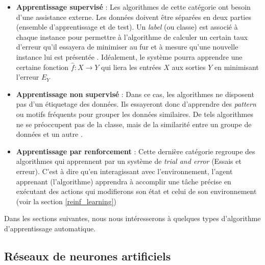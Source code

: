 \begin{itemize}
	\item  \textbf{Apprentissage supervisé} : Les algorithmes de cette catégorie ont besoin d'une assistance externe. Les données doivent être séparées en deux parties (ensemble d'apprentissage et de test). Un \textit{label} (ou classe) est associé à chaque instance pour permettre à l'algorithme de calculer un certain taux d'erreur qu'il essayera de minimiser au fur et à mesure qu'une nouvelle instance lui est présentée \citep{supervised_learning}. Idéalement, le système pourra apprendre une certaine fonction $\hat{f} : X \rightarrow Y$ qui liera les entrées $X$ aux sorties $Y$ en minimisant l'erreur $E_Y$ 
	
	\item \textbf{Apprentissage non supervisé} : Dans ce cas, les algorithmes ne disposent pas d'un étiquetage des données. Ils essayeront donc d'apprendre des \textit{pattern} ou motifs fréquents pour grouper les données similaires. De tels algorithmes ne se préoccupent pas de la classe, mais de la similarité entre un groupe de données et un autre \citep{unsupervised_learning}.
	
	\item \textbf{Apprentissage par renforcement} : Cette dernière catégorie regroupe des algorithmes qui apprennent par un système de \textit{trial and error} (Essais et erreur). C'est à dire qu'en interagissant avec l'environnement, l'agent apprenant (l'algorithme) apprendra à accomplir une tâche précise en exécutant des actions qui modifierons son état et celui de son environnement (voir la section \ref{reinf_learning})
\end{itemize}
\par
Dans les sections suivantes, nous nous intéresserons à quelques types d'algorithme d'apprentissage automatique. 
\subsection{Réseaux de neurones artificiels}
